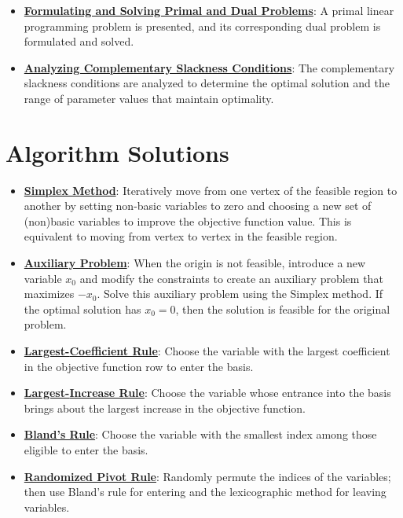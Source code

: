 \documentclass{article}%
\begin{document}
\begin{itemize}[leftmargin=*]
\item \href{https://www.math.purdue.edu/~yipn/421/2024-12-03-Duality.pdf#page=29}{\textbf{Formulating and Solving Primal and Dual Problems}}: A primal linear programming problem is presented, and its corresponding dual problem is formulated and solved.%
\item \href{https://www.math.purdue.edu/~yipn/421/2024-12-03-Duality.pdf#page=31}{\textbf{Analyzing Complementary Slackness Conditions}}: The complementary slackness conditions are analyzed to determine the optimal solution and the range of parameter values that maintain optimality.%
\end{itemize}

%
\section{Algorithm Solutions}%
\label{sec:AlgorithmSolutions}%
\begin{itemize}[leftmargin=*]%
\item \href{https://www.math.purdue.edu/~yipn/421/2024-08-27-ExSimplex.pdf#page=6}{\textbf{Simplex Method}}: Iteratively move from one vertex of the feasible region to another by setting non-basic variables to zero and choosing a new set of (non)basic variables to improve the objective function value. This is equivalent to moving from vertex to vertex in the feasible region.%
\item \href{https://www.math.purdue.edu/~yipn/421/2024-08-27-ExSimplex.pdf#page=32}{\textbf{Auxiliary Problem}}: When the origin is not feasible, introduce a new variable $x_0$ and modify the constraints to create an auxiliary problem that maximizes $-x_0$. Solve this auxiliary problem using the Simplex method. If the optimal solution has $x_0 = 0$, then the solution is feasible for the original problem.%
\end{itemize}%
\begin{itemize}[leftmargin=*]%
\item \href{https://www.math.purdue.edu/~yipn/421/2024-09-05-SimplexEfficiency.pdf#page=4}{\textbf{Largest{-}Coefficient Rule}}: Choose the variable with the largest coefficient in the objective function row to enter the basis.%
\item \href{https://www.math.purdue.edu/~yipn/421/2024-09-05-SimplexEfficiency.pdf#page=6}{\textbf{Largest{-}Increase Rule}}: Choose the variable whose entrance into the basis brings about the largest increase in the objective function.%
\item \href{https://www.math.purdue.edu/~yipn/421/2024-09-05-SimplexEfficiency.pdf#page=10}{\textbf{Bland's Rule}}: Choose the variable with the smallest index among those eligible to enter the basis.%
\item \href{https://www.math.purdue.edu/~yipn/421/2024-09-05-SimplexEfficiency.pdf#page=10}{\textbf{Randomized Pivot Rule}}: Randomly permute the indices of the variables; then use Bland's rule for entering and the lexicographic method for leaving variables.%
\end{itemize}%
\end{document}
